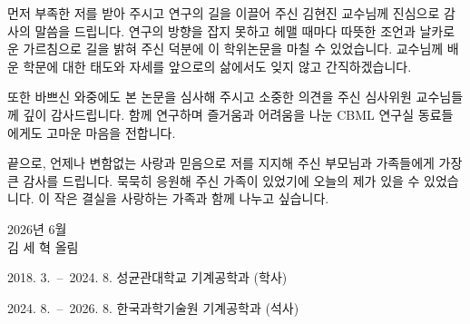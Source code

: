 \documentclass[master,english,final]{kaist-ucs}
\begin{document}




\acknowledgment[1]
먼저 부족한 저를 받아 주시고 연구의 길을 이끌어 주신 김현진 교수님께 진심으로 감사의 말씀을 드립니다. 연구의 방향을 잡지 못하고 헤맬 때마다 따뜻한 조언과 날카로운 가르침으로 길을 밝혀 주신 덕분에 이 학위논문을 마칠 수 있었습니다. 교수님께 배운 학문에 대한 태도와 자세를 앞으로의 삶에서도 잊지 않고 간직하겠습니다.

또한 바쁘신 와중에도 본 논문을 심사해 주시고 소중한 의견을 주신 심사위원 교수님들께 깊이 감사드립니다. 함께 연구하며 즐거움과 어려움을 나눈 CBML 연구실 동료들에게도 고마운 마음을 전합니다.

끝으로, 언제나 변함없는 사랑과 믿음으로 저를 지지해 주신 부모님과 가족들에게 가장 큰 감사를 드립니다. 묵묵히 응원해 주신 가족이 있었기에 오늘의 제가 있을 수 있었습니다. 이 작은 결실을 사랑하는 가족과 함께 나누고 싶습니다.

\hfill 2026년 6월\\
\hfill 김 세 혁 올림


\curriculumvitae[1]

\begin{personaldata}
    \address    {(34141) 대전광역시 유성구 대학로 291, 한국과학기술원 갈릴레이관(W3)}
\end{personaldata}

\begin{education}
    \item[2018. 3.\ --\ 2024. 8.] 성균관대학교 기계공학과 (학사)
    \item[2024. 8.\ --\ 2026. 8.] 한국과학기술원 기계공학과 (석사)
\end{education}

\label{paperlastpagelabel}
\end{document}
